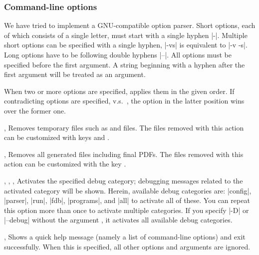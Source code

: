 \documentclass[draft]{llmk-doc}
\begin{document}
\subsubsection*{Command-line options }
\enlargethispage{5mm}%

We have tried to implement a GNU-compatible option parser. Short options, each of
which consists of a single letter, must start with a single hyphen |-|.
Multiple short options can be specified with a single hyphen, \eg |-vs| is
equivalent to |-v -s|. Long options have to be following double hyphens |--|.
All options must be specified before the first argument. A string beginning
with a hyphen after the first argument will be treated as an argument.

When two or more options are specified,  applies them in the given
order. If contradicting options are specified, \eg {} v.s.\ , the
option in the latter position wins over the former one.

\begin{clopt}{, }
Removes temporary files such as  and  files. The files
removed with this action can be customized with keys  and
.
\end{clopt}

\begin{clopt}{, }
Removes all generated files including final PDFs. The files removed with this
action can be customized with the key .
\end{clopt}

\begin{clopt}{%
  , ,
  , }
Activates the specified debug category; debugging messages related to the
activated category will be shown. Herein, available debug categories are:
|config|, |parser|, |run|, |fdb|, |programs|, and |all| to activate all of
these. You can repeat this option more than once to activate multiple
categories. If you specify |-D| or |--debug| without the argument
, it activates all available debug categories.
\end{clopt}

\begin{clopt}{, }
Shows a quick help message (namely a list of command-line options) and exit
successfully. When this is specified, all other options and arguments are
ignored.
\end{clopt}
\end{document}
